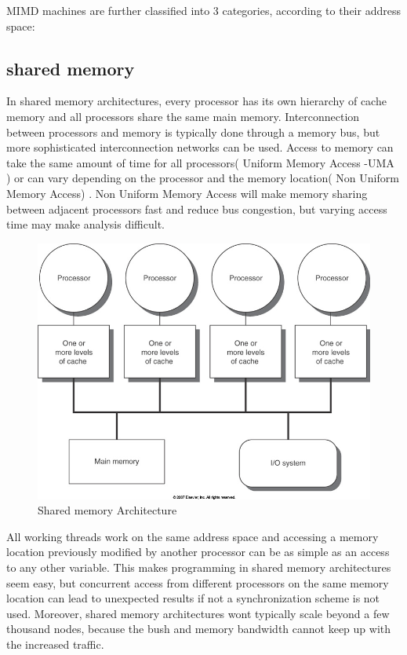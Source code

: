 MIMD machines are further classified into 3 categories, according to their address space:

\subsection{shared memory}

In shared memory architectures, every processor has its own hierarchy of cache memory and all processors share the same main memory. Interconnection between processors and memory is typically done through a memory bus, but more sophisticated interconnection networks can be used. Access to memory can take the same amount of time for all processors( Uniform Memory Access -UMA ) or can vary depending on the processor and the memory location( Non Uniform Memory Access) . Non Uniform Memory Access will make memory sharing between adjacent processors fast and reduce bus congestion, but varying access time may make analysis difficult. 


\begin{figure}
 \centering
  \includegraphics[scale=0.4]{shared_memory.jpg}
\caption{Shared memory Architecture}
\label{Shared memory architecture}
\end{figure}

 All working threads work on the same address space and accessing a memory location previously modified by another processor can be as simple as an access to any other variable. This makes programming in shared memory architectures seem easy, but concurrent access from different processors on the same memory location can lead to unexpected results if not a synchronization scheme is not used. Moreover, shared memory architectures wont typically scale beyond a few thousand nodes, because the bush and memory bandwidth cannot keep up with the increased traffic.

